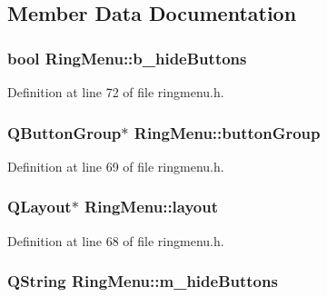 \subsection{Member Data Documentation}
\hypertarget{classRingMenu_aea35804a8279e64176a639c1d16a8be1}{
\subsubsection[{b\_\-hideButtons}]{\setlength{\rightskip}{0pt plus 5cm}bool {\bf RingMenu::b\_\-hideButtons}}}
\label{classRingMenu_aea35804a8279e64176a639c1d16a8be1}


Definition at line 72 of file ringmenu.h.

\hypertarget{classRingMenu_af6cb8d6f3b6de7197633c558020dff5d}{
\subsubsection[{buttonGroup}]{\setlength{\rightskip}{0pt plus 5cm}QButtonGroup$\ast$ {\bf RingMenu::buttonGroup}}}
\label{classRingMenu_af6cb8d6f3b6de7197633c558020dff5d}


Definition at line 69 of file ringmenu.h.

\hypertarget{classRingMenu_af0f01459ece60416bad089171cfe7a2a}{
\subsubsection[{layout}]{\setlength{\rightskip}{0pt plus 5cm}QLayout$\ast$ {\bf RingMenu::layout}}}
\label{classRingMenu_af0f01459ece60416bad089171cfe7a2a}


Definition at line 68 of file ringmenu.h.

\hypertarget{classRingMenu_af9f395e6f878ed78c19507f1aea10085}{
\subsubsection[{m\_\-hideButtons}]{\setlength{\rightskip}{0pt plus 5cm}QString {\bf RingMenu::m\_\-hideButtons}}}
\label{classRingMenu_af9f395e6f878ed78c19507f1aea10085}


